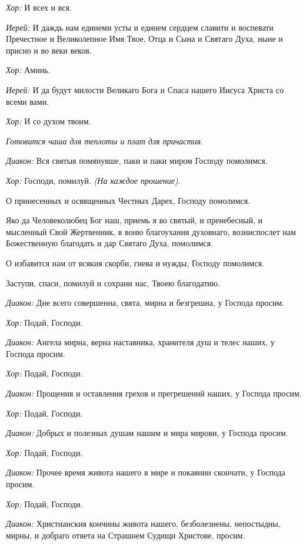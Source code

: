 \begin{mymulticols}
{\itshape Хор:} И всех и вся.

{\itshape Иерей:} И даждь нам единеми усты и единем сердцем славити и воспевати Пречестное и Великолепное Имя Твое, Отца и Сына и Святаго Духа, ныне и присно и во веки веков. 

{\itshape Хор:} Аминь.

{\itshape Иерей:} И да будут милости Великаго Бога и Спаса нашего Иисуса Христа со всеми вами.

{\itshape Хор:} И со духом твоим.

{\itshape Готовится чаша для теплоты и плат для причастия}. 


{\itshape Диакон:} Вся святыя помянувше, паки и паки миром Господу помолимся. 

{\itshape Хор:} Господи, помилуй. {\itshape (На каждое прошение)}. 

О принесенных и освященных Честных Дарех, Господу помолимся. 

Яко да Человеколюбец Бог наш, приемь я во святый, и пренебесный, и мысленный Свой Жертвенник, в воню благоухания духовнаго, возниспослет нам Божественную благодать и дар Святаго Духа, помолимся. 

О избавится нам от всякия скорби, гнева и нужды, Господу помолимся. 

Заступи, спаси, помилуй и сохрани нас, Твоею благодатию. 

{\itshape Диакон:} Дне всего совершенна, свята, мирна и безгрешна, у Господа просим. 

{\itshape Хор:} Подай, Господи.

{\itshape Диакон:} Ангела мирна, верна наставника, хранителя душ и телес наших, у Господа просим. 

{\itshape Хор:} Подай, Господи.

{\itshape Диакон:} Прощения и оставления грехов и прегрешений наших, у Господа просим. 

{\itshape Хор:} Подай, Господи.

{\itshape Диакон:} Добрых и полезных душам нашим и мира мирови, у Господа просим. 

{\itshape Хор:} Подай, Господи.

{\itshape Диакон:} Прочее время живота нашего в мире и покаянии скончати, у Господа просим. 

{\itshape Хор:} Подай, Господи.

{\itshape Диакон:} Христианския кончины живота нашего, безболезнены, непостыдны, мирны, и добраго ответа на Страшнем Судищи Христове, просим. 


\end{mymulticols}
